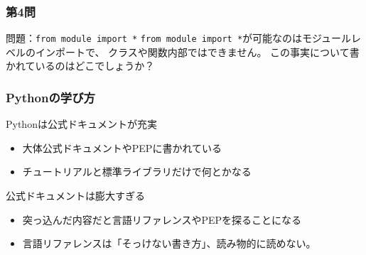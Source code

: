 \documentclass[aspectratio=169,dvipdfmx,12pt,notheorems]{beamer}
\theoremstyle{definition}
\begin{document}
\begin{frame}\frametitle{第4問}

\begin{block}{問題：\texttt{from module import *}}
\texttt{from module import *}が可能なのはモジュールレベルのインポートで、
クラスや関数内部ではできません。
この事実について書かれているのはどこでしょうか？
\end{block}


\end{frame}

\begin{frame}\frametitle{Pythonの学び方}

\begin{block}{Pythonは公式ドキュメントが充実}
\begin{itemize}
\item 大体公式ドキュメントやPEPに書かれている
\item チュートリアルと標準ライブラリだけで何とかなる
\end{itemize}
\end{block}

\begin{alertblock}{公式ドキュメントは膨大すぎる}
\begin{itemize}
\item 突っ込んだ内容だと言語リファレンスやPEPを探ることになる
\item 言語リファレンスは「そっけない書き方」、読み物的に読めない。
\end{itemize}
\end{alertblock}

\end{frame}
\end{document}
